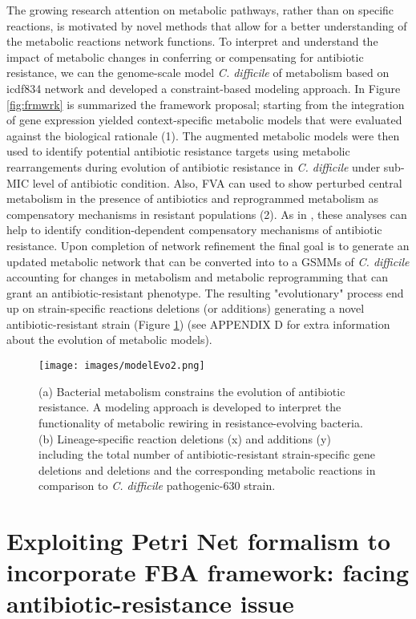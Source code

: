 \documentclass{article}
\begin{document}
The growing research attention on metabolic pathways, rather than on specific reactions, is motivated by novel methods that allow for a better understanding of the metabolic reactions network functions. To interpret and understand the impact of metabolic changes in conferring or compensating for antibiotic resistance, we can the genome-scale model {\it C. difficile} of metabolism based on icdf834 network and developed a constraint-based modeling approach. In Figure \ref{fig:frmwrk} is summarized the framework proposal; starting from the integration of gene expression yielded context-specific metabolic models that were evaluated against the biological rationale (1). The augmented metabolic models were then used to identify potential antibiotic resistance targets using metabolic rearrangements during evolution of antibiotic resistance in {\it C. difficile} under sub-MIC level of antibiotic condition. Also, FVA can used to show perturbed central metabolism in the presence of antibiotics and reprogrammed metabolism as compensatory mechanisms in resistant populations (2). As in \cite{Zampieri}, these analyses can help to identify condition-dependent compensatory mechanisms of antibiotic resistance. Upon completion of network refinement the final goal is to generate an updated metabolic network that can be converted into to a GSMMs of {\it C. difficile} accounting for changes in metabolism and metabolic reprogramming that can grant an antibiotic-resistant phenotype. The resulting "evolutionary" process end up on strain-specific reactions deletions (or additions) generating a novel antibiotic-resistant strain (Figure \ref{fig:modelEvo2}) (see APPENDIX D for extra information about the evolution of metabolic models).

\begin{figure}
\centering
\texttt{[image: images/modelEvo2.png]}
\caption{\label{fig:modelEvo2} (a) Bacterial metabolism constrains the evolution of antibiotic resistance. A modeling approach is developed to interpret the functionality of metabolic rewiring in resistance-evolving bacteria. (b) Lineage-specific reaction deletions (x) and additions (y) including the total number of antibiotic-resistant strain-specific gene deletions and deletions and the corresponding metabolic reactions in comparison to {\it C. difficile} pathogenic-630 strain.}
\end{figure}

\section{Exploiting Petri Net formalism to incorporate FBA framework: facing antibiotic-resistance issue}
\end{document}
